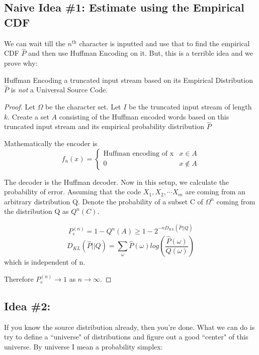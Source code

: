 \documentclass[scrartcl]{article}
\begin{document}
\subsection{Naive Idea \#1: Estimate using the Empirical CDF}
We can wait till the $n^{\text{th}}$ character is inputted and use that to find the empirical CDF $\hat{P}$
and then use Huffman Encoding on it. But, this is a terrible idea and we prove why:
\begin{theorem*}
Huffman Encoding a truncated input stream based on its Empirical Distribution $\hat{P}$ is \textit{not} a Universal Source Code. 
\end{theorem*}
\begin{proof}
Let $\Omega$ be the character set. Let $I$ be the truncated input stream of length $k$. Create a set $A$ consisting of the Huffman encoded words based on this truncated input stream and its empirical probability distribution $\hat{P}$

Mathematically the encoder is \[
f_n(x) = \begin{cases} 
 \text{Huffman encoding of x} & x \in A \\
 0 & x \notin A
 \end{cases}
\]

The decoder is the Huffman decoder. 
Now in this setup, we calculate the probability of error. Assuming that the code $X_1, X_2, \cdots X_m$ are coming from an arbitrary distribution Q. Denote the probability of a subset C of $\Omega^n$ coming from the distribution Q as $Q^n(C) $. 

$$P_e^{(n)} = 1- Q^n(A) \geq 1 - 2^{-nD_{KL}(\hat{P}||Q)}$$
$$D_{KL}(\hat{P} || Q) = \sum\limits_{\omega} \hat{P}(\omega) log\left(\frac{\hat{P}(\omega)}{Q(\omega)}\right)$$ which is independent of n. 

Therefore $P_e^{(n)} \rightarrow 1$ as $n \rightarrow \infty$.
\end{proof}
\subsection{Idea \#2:}
If you know the source distribution already, then you're done. What we can do is try to define a ``universe" of distributions and figure out a good ``center" of this universe. By universe I mean a probability simplex: 
\end{document}
